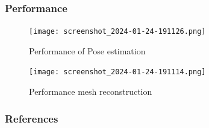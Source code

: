 \documentclass[11pt]{beamer}
\begin{document}
\begin{frame}
\frametitle{Performance}
\begin{minipage}{0.49\textwidth}
\begin{figure}
    \texttt{[image: screenshot\_2024-01-24-191126.png]} 
    \caption{Performance of Pose estimation}
\end{figure}
\end{minipage}
\begin{minipage}{0.49\textwidth}
\begin{figure}
    \texttt{[image: screenshot\_2024-01-24-191114.png]} 
    \caption{Performance mesh reconstruction}
\end{figure}
\end{minipage}
\end{frame}
\begin{frame}[allowframebreaks]
\footnotesize
  \frametitle{References}
  
{}
\end{frame}
\end{document}
